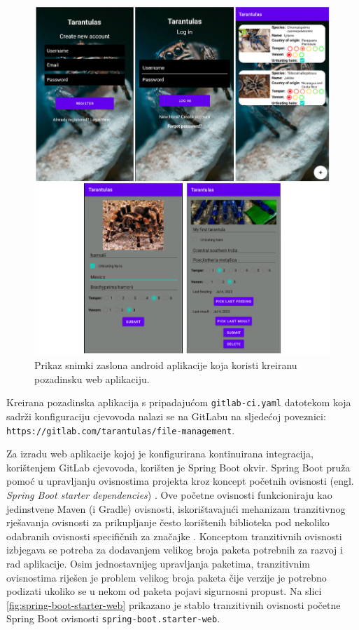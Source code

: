 \documentclass[a4paper,12pt,oneside]{article}
\begin{document}
\begin{figure}
    \centering
    \includegraphics[width=1\linewidth]{Slike/android-app.png}
    \caption{Prikaz snimki zaslona android aplikacije koja koristi kreiranu pozadinsku web aplikaciju.}
    \label{fig:android-app}
\end{figure}

Kreirana pozadinska aplikacija s pripadajućom \texttt{gitlab-ci.yaml} datotekom koja sadrži konfiguraciju cjevovoda nalazi se na GitLabu na sljedećoj poveznici: \texttt{https://gitlab.com\-/tarantulas/file-management}. 

 Za izradu web aplikacije kojoj je konfigurirana kontinuirana integracija, korištenjem GitLab cjevovoda, korišten je Spring Boot okvir. Spring Boot pruža pomoć u upravljanju ovisnostima projekta kroz koncept početnih ovisnosti (engl. \textit{Spring Boot starter dependencies}) \cite{walls2016spring}. Ove početne ovisnosti funkcioniraju kao jedinstvene Maven (i Gradle) ovisnosti, iskorištavajući mehanizam tranzitivnog rješavanja ovisnosti za prikupljanje često korištenih biblioteka pod nekoliko odabranih ovisnosti specifičnih za značajke \cite{springBootInAction}. Konceptom tranzitivnih ovisnosti izbjegava se potreba za dodavanjem velikog broja paketa potrebnih za razvoj i rad aplikacije. Osim jednostavnijeg upravljanja paketima, tranzitivnim ovisnostima riješen je problem velikog broja paketa čije verzije je potrebno podizati ukoliko se u nekom od paketa pojavi sigurnosni propust. Na slici \ref{fig:spring-boot-starter-web} prikazano je stablo tranzitivnih ovisnosti početne Spring Boot ovisnosti \texttt{spring-boot.starter-web}. 
 
\end{document}
